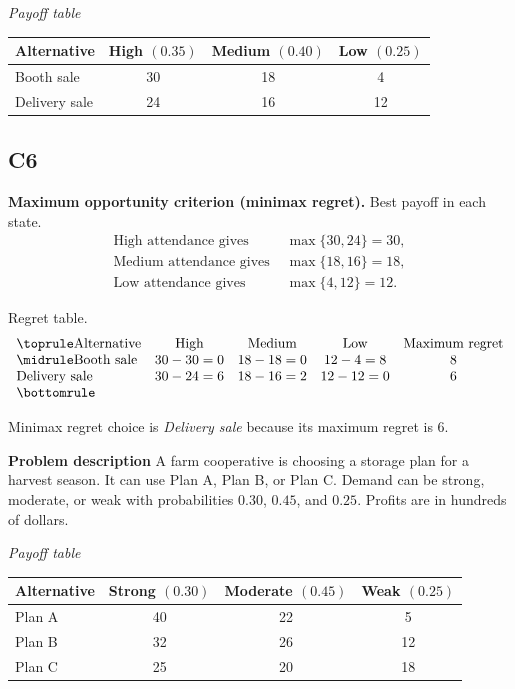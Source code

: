 \begin{ExamProblems}
		\begin{center}
			\textit{Payoff table}\\
			\begin{tabular}{l c c c}
				\toprule
				Alternative & High $(0.35)$ & Medium $(0.40)$ & Low $(0.25)$ \\
				\midrule
				Booth sale & 30 & 18 & 4 \\
				Delivery sale & 24 & 16 & 12 \\
				\bottomrule
			\end{tabular}
		\end{center}

		\subsection*{C6}
		\textbf{Maximum opportunity criterion (minimax regret).} Best payoff in each state.
		\[
		\begin{aligned}
		\text{High attendance gives } &\max\{30,24\}=30,\\
		\text{Medium attendance gives } &\max\{18,16\}=18,\\
		\text{Low attendance gives } &\max\{4,12\}=12.
		\end{aligned}
		\]

		Regret table.
		\[
		\begin{array}{lcccc}
			\toprule
			\text{Alternative} & \text{High} & \text{Medium} & \text{Low} & \text{Maximum regret}\\
			\midrule
			\text{Booth sale} & 30-30=0 & 18-18=0 & 12-4=8 & 8\\
			\text{Delivery sale} & 30-24=6 & 18-16=2 & 12-12=0 & 6\\
			\bottomrule
		\end{array}
		\]

		Minimax regret choice is \emph{Delivery sale} because its maximum regret is $6$.

		\item
		\textbf{Problem description}
		A farm cooperative is choosing a storage plan for a harvest season. It can use Plan A, Plan B, or Plan C. Demand can be strong, moderate, or weak with probabilities $0.30$, $0.45$, and $0.25$. Profits are in hundreds of dollars.

		\begin{center}
			\textit{Payoff table}\\
			\begin{tabular}{l c c c}
				\toprule
				Alternative & Strong $(0.30)$ & Moderate $(0.45)$ & Weak $(0.25)$ \\
				\midrule
				Plan A & 40 & 22 & 5 \\
				Plan B & 32 & 26 & 12 \\
				Plan C & 25 & 20 & 18 \\
				\bottomrule
			\end{tabular}
		\end{center}


\end{ExamProblems}
